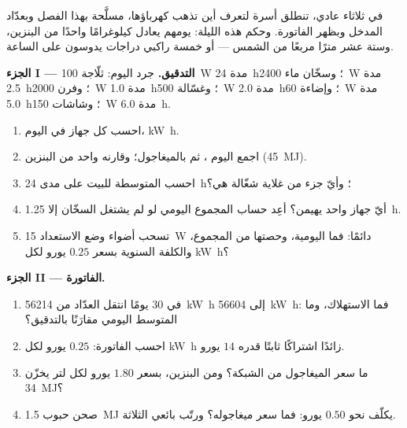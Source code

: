 \begin{problem}
\label{pb:g10:energy-conservation:1}
في ثلاثاء عادي، تنطلق أسرة لتعرف أين تذهب
كهرباؤها، مسلَّحة بهذا الفصل وبعدّاد المدخل
وبظهر الفاتورة. وحكم هذه الليلة: يومهم يعادل
كيلوغرامًا واحدًا من البنزين، وستة عشر مترًا مربعًا من الشمس --- أو خمسة
راكبي دراجات يدوسون على  الساعة.

\medskip
\noindent\textbf{الجزء I --- التدقيق.}
جرد اليوم: ثلّاجة \qty{100}{W} مدة \qty{24}{h}؛ وسخّان
ماء \qty{2400}{W} مدة \qty{2.5}{h}؛ وفرن \qty{2000}{W} مدة
\qty{1.0}{h}؛ وغسّالة \qty{500}{W} مدة \qty{2.0}{h}؛ وإضاءة
\qty{60}{W} مدة \qty{5.0}{h}؛ وشاشات \qty{150}{W} مدة \qty{6.0}{h}.
\begin{enumerate}
  \item احسب  كل جهاز في اليوم،  \unit{kW.h}.
  \item اجمع اليوم ، ثم بالميغاجول؛
        وقارنه  واحد من البنزين (\qty{45}{MJ}).
  \item احسب  المتوسطة للبيت على مدى \qty{24}{h}؛
        وأيّ جزء من غلاية شغّالة هي؟
  \item أيّ جهاز واحد يهيمن؟ أعِد حساب المجموع اليومي
        لو لم يشتغل السخّان إلا \qty{1.25}{h}.
  \item تسحب أضواء وضع الاستعداد \qty{15}{W} دائمًا: فما  اليومية،
        وحصتها من المجموع، والكلفة السنوية بسعر $0.25$ يورو لكل \unit{kW.h}؟
\end{enumerate}

\medskip
\noindent\textbf{الجزء II --- الفاتورة.}
\begin{enumerate}[resume]
  \item في 30 يومًا انتقل العدّاد من \qty{56214}{kW.h} إلى
        \qty{56604}{kW.h}: فما الاستهلاك، وما المتوسط اليومي مقارَنًا
        بالتدقيق؟
  \item احسب الفاتورة: $0.25$ يورو لكل \unit{kW.h} زائدًا
        اشتراكًا ثابتًا قدره $14$ يورو.
  \item ما سعر الميغاجول من الشبكة؟ ومن البنزين، بسعر
        $1.80$ يورو لكل لتر يخزّن \qty{34}{MJ}؟
  \item صحن حبوب \qty{1.5}{MJ} يكلّف نحو $0.50$ يورو: فما
        سعر ميغاجوله؟ ورتّب بائعي  الثلاثة.
\end{enumerate}


\end{problem}
